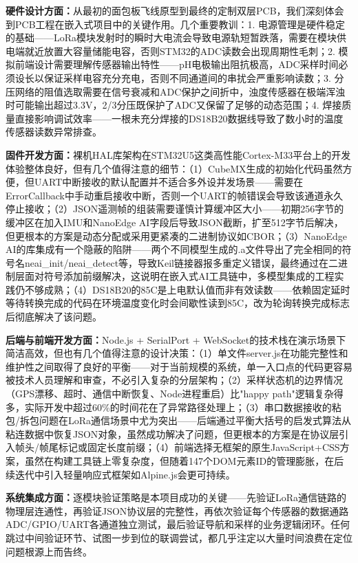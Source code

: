 \documentclass[12pt,a4paper]{ctexart}
\begin{document}
\textbf{硬件设计方面：}从最初的面包板飞线原型到最终的定制双层PCB，我们深刻体会到PCB工程在嵌入式项目中的关键作用。几个重要教训：1. 电源管理是硬件稳定的基础——LoRa模块发射时的瞬时大电流会导致电源轨短暂跌落，需要在模块供电端就近放置大容量储能电容，否则STM32的ADC读数会出现周期性毛刺；2. 模拟前端设计需要理解传感器输出特性——pH电极输出阻抗极高，ADC采样时间必须设长以保证采样电容充分充电，否则不同通道间的串扰会严重影响读数；3. 分压网络的阻值选取需要在信号衰减和ADC保护之间折中，浊度传感器在极端浑浊时可能输出超过3.3V，2/3分压既保护了ADC又保留了足够的动态范围；4. 焊接质量直接影响调试效率——一根未充分焊接的DS18B20数据线导致了数小时的温度传感器读数异常排查。

\textbf{固件开发方面：}裸机HAL库架构在STM32U5这类高性能Cortex-M33平台上的开发体验整体良好，但有几个值得注意的细节：（1）CubeMX生成的初始化代码虽然方便，但UART中断接收的默认配置并不适合多外设并发场景——需要在ErrorCallback中手动重启接收中断，否则一个UART的帧错误会导致该通道永久停止接收；（2）JSON遥测帧的组装需要谨慎计算缓冲区大小——初期256字节的缓冲区在加入IMU和NanoEdge AI字段后导致JSON截断，扩至512字节后解决，但更根本的方案是动态分配或采用更紧凑的二进制协议如CBOR；（3）NanoEdge AI的库集成有一个隐蔽的陷阱——两个不同模型生成的.a文件导出了完全相同的符号名neai\_init/neai\_detect等，导致Keil链接器报多重定义错误，最终通过在二进制层面对符号添加前缀解决，这说明在嵌入式AI工具链中，多模型集成的工程实践仍不够成熟；（4）DS18B20的85\textdegree C是上电默认值而非有效读数——依赖固定延时等待转换完成的代码在环境温度变化时会间歇性读到85\textdegree C，改为轮询转换完成标志后彻底解决了该问题。

\textbf{后端与前端开发方面：}Node.js + SerialPort + WebSocket的技术栈在演示场景下简洁高效，但也有几个值得注意的设计决策：（1）单文件server.js在功能完整性和维护性之间取得了良好的平衡——对于当前规模的系统，单一入口点的代码更容易被技术人员理解和审查，不必引入复杂的分层架构；（2）采样状态机的边界情况（GPS漂移、超时、通信中断恢复、Node进程重启）比"happy path"逻辑复杂得多，实际开发中超过60\%的时间花在了异常路径处理上；（3）串口数据接收的粘包/拆包问题在LoRa通信场景中尤为突出——后端通过平衡大括号的启发式算法从粘连数据中恢复JSON对象，虽然成功解决了问题，但更根本的方案是在协议层引入帧头/帧尾标记或固定长度前缀；（4）前端选择无框架的原生JavaScript+CSS方案，虽然在构建工具链上零复杂度，但随着147个DOM元素ID的管理膨胀，在后续迭代中引入轻量响应式框架如Alpine.js会更可持续。

\textbf{系统集成方面：}逐模块验证策略是本项目成功的关键——先验证LoRa通信链路的物理层连通性，再验证JSON协议层的完整性，再依次验证每个传感器的数据通路ADC/GPIO/UART各通道独立测试，最后验证导航和采样的业务逻辑闭环。任何跳过中间验证环节、试图一步到位的联调尝试，都几乎注定以大量时间浪费在定位问题根源上而告终。
\end{document}
